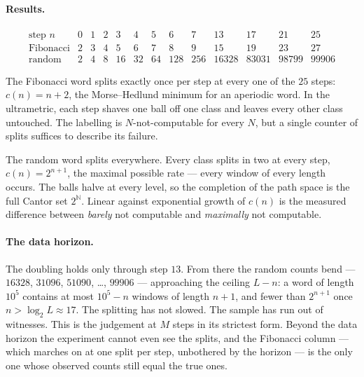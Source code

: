 \documentclass[11pt, a4paper]{article}
\theoremstyle{definition}
\theoremstyle{plain}
\begin{document}
\paragraph{Results.}
\[
\begin{array}{r|cccccccc|cccc}
  \text{step } n & 0 & 1 & 2 & 3 & 4 & 5 & 6 & 7
                 & 13 & 17 & 21 & 25 \\
  \hline
  \text{Fibonacci} & 2 & 3 & 4 & 5 & 6 & 7 & 8 & 9
                   & 15 & 19 & 23 & 27 \\
  \text{random}    & 2 & 4 & 8 & 16 & 32 & 64 & 128 & 256
                   & 16328 & 83031 & 98799 & 99906
\end{array}
\]

The Fibonacci word splits exactly once per step at every one of the
$25$ steps: $c(n) = n+2$, the Morse--Hedlund minimum for an
aperiodic word.  In the ultrametric, each step shaves one ball off
one class and leaves every other class untouched.  The labelling is
$N$-not-computable for every $N$, but a single counter of splits
suffices to describe its failure.

The random word splits everywhere.  Every class splits in two at
every step, $c(n) = 2^{n+1}$, the maximal possible rate --- every
window of every length occurs.  The balls halve at every level, so
the completion of the path space is the full Cantor set
$2^{\mathbb{N}}$.  Linear against exponential growth of $c(n)$ is
the measured difference between \emph{barely} not computable and
\emph{maximally} not computable.

\paragraph{The data horizon.}
The doubling holds only through step $13$.  From there the random
counts bend --- $16328$, $31096$, $51090$, \dots, $99906$ ---
approaching the ceiling $L - n$: a word of length $10^5$ contains at
most $10^5 - n$ windows of length $n+1$, and fewer than $2^{n+1}$
once $n > \log_2 L \approx 17$.  The splitting has not slowed.  The
sample has run out of witnesses.  This is the judgement at $M$ steps
in its strictest form.  Beyond the data horizon the experiment cannot
even see the splits, and the Fibonacci column --- which marches on
at one split per step, unbothered by the horizon --- is the only one
whose observed counts still equal the true ones.
\end{document}
